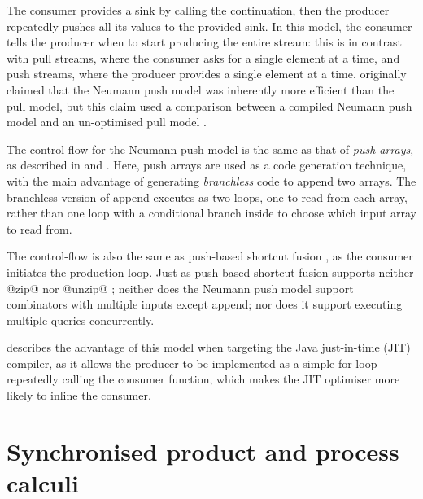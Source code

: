 The consumer provides a sink by calling the continuation, then the producer repeatedly pushes all its values to the provided sink.
In this model, the consumer tells the producer when to start producing the entire stream: this is in contrast with pull streams, where the consumer asks for a single element at a time, and push streams, where the producer provides a single element at a time.
\citet{neumann2011efficiently} originally claimed that the Neumann push model was inherently more efficient than the pull model, but this claim used a comparison between a compiled Neumann push model and an un-optimised pull model \cite{shaikhha2018push}.

The control-flow for the Neumann push model is the same as that of \emph{push arrays}, as described in \citet{claessen2012expressive} and \citet{svensson2014defunctionalizing}.
Here, push arrays are used as a code generation technique, with the main advantage of generating \emph{branchless} code to append two arrays.
The branchless version of append executes as two loops, one to read from each array, rather than one loop with a conditional branch inside to choose which input array to read from.

The control-flow is also the same as push-based shortcut fusion \cite{gill1993short}, as the consumer initiates the production loop.
Just as push-based shortcut fusion supports neither @zip@ nor @unzip@ \cite{svenningsson2002shortcut}; neither does the Neumann push model support combinators with multiple inputs except append; nor does it support executing multiple queries concurrently.

\citet{biboudis2017expressive} describes the advantage of this model when targeting the Java just-in-time (JIT) compiler, as it allows the producer to be implemented as a simple for-loop repeatedly calling the consumer function, which makes the JIT optimiser more likely to inline the consumer.




\section{Synchronised product and process calculi}
\label{related/synchronised-product}

